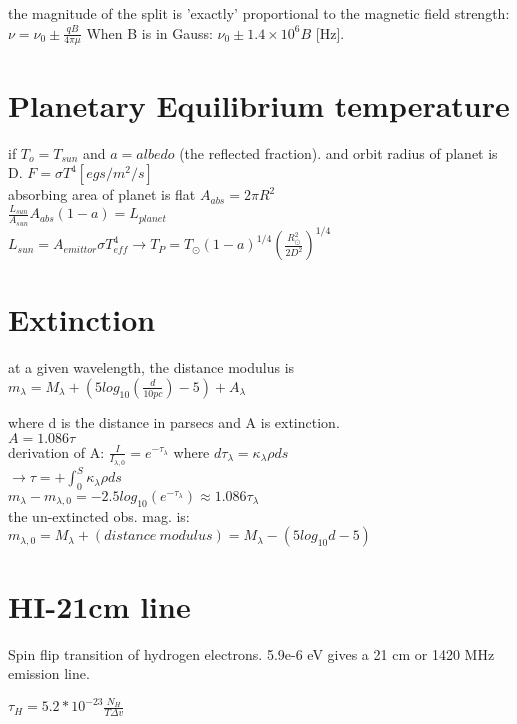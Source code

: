 \documentclass[12pt]{report}
\begin{document}
the magnitude of the split is 'exactly' proportional to the magnetic field strength: \(\boxed{\nu=\nu_0\pm \frac{qB}{4\pi\mu}}\)
When B is in Gauss: \({\nu_0\pm1.4\times10^6B }\) [Hz].  




\section{Planetary Equilibrium temperature}
if $T_o=T_{sun}$ and $a=albedo$ (the reflected fraction). and orbit radius of planet is D. $F=\sigma T^4 [egs/m^2/s]$\\
absorbing area of planet is flat $A_{abs}=2\pi R^2$\\ 
$\frac{L_{sun}}{A_{sun}}A_{abs}(1-a)=L_{planet}$\\
$L_{sun}=A_{emittor}\sigma T_{eff}^4 \rightarrow T_P=T_\odot(1-a)^{1/4}(\frac{R_\odot^2}{2D^2})^{1/4}$\\



\section{Extinction}
at a given wavelength, the distance modulus is 
\(m_\lambda=M_\lambda+(5log_{10}(\frac{d}{10pc})-5)+A_\lambda\)

where d is the distance in parsecs and A is extinction.\\
$A=1.086\tau$\\
derivation of A: $\frac{I}{I_{\lambda,0}}=e^{-\tau_\lambda}$ where $d\tau_\lambda=\kappa_\lambda\rho ds$\\
$\rightarrow \tau=+\int_0^S\kappa_\lambda\rho ds$\\
$m_\lambda-m_{\lambda, 0}=-2.5log_{10}(e^{-\tau_\lambda})\approx 1.086\tau_\lambda$\\
the un-extincted obs. mag. is: $m_{\lambda, 0}=M_\lambda+(distance \ modulus)=M_\lambda-(5log_{10}d-5)$



\section{HI-21cm line}
Spin flip transition of hydrogen electrons. 5.9e-6 eV gives a 21 cm or 1420 MHz emission line.
 
$\tau_H=5.2*10^{-23} \frac{N_H}{T\Delta v}$\\
\end{document}
